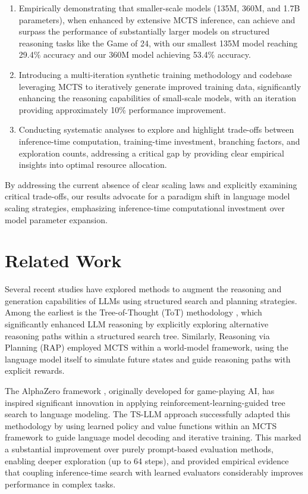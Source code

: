 \documentclass{article}
\begin{document}
\begin{enumerate}
\item Empirically demonstrating that smaller-scale models (135M, 360M, and 1.7B parameters), when enhanced by extensive MCTS inference, can achieve and surpass the performance of substantially larger models on structured reasoning tasks like the Game of 24, with our smallest 135M model reaching 29.4\% accuracy and our 360M model achieving 53.4\% accuracy.
\item Introducing a multi-iteration synthetic training methodology and codebase leveraging MCTS to iteratively generate improved training data, significantly enhancing the reasoning capabilities of small-scale models, with an iteration providing approximately 10\% performance improvement.
\item Conducting systematic analyses to explore and highlight trade-offs between inference-time computation, training-time investment, branching factors, and exploration counts, addressing a critical gap by providing clear empirical insights into optimal resource allocation.
\end{enumerate}

By addressing the current absence of clear scaling laws and explicitly examining critical trade-offs, our results advocate for a paradigm shift in language model scaling strategies, emphasizing inference-time computational investment over model parameter expansion.

\section{Related Work} Several recent studies have explored methods to augment the reasoning and generation capabilities of LLMs using structured search and planning strategies. Among the earliest is the Tree-of-Thought (ToT) methodology \cite{yao2023tree}, which significantly enhanced LLM reasoning by explicitly exploring alternative reasoning paths within a structured search tree. Similarly, Reasoning via Planning (RAP) \cite{hao2023reasoning} employed MCTS within a world-model framework, using the language model itself to simulate future states and guide reasoning paths with explicit rewards.

The AlphaZero framework \cite{silver2017mastering}, originally developed for game-playing AI, has inspired significant innovation in applying reinforcement-learning-guided tree search to language modeling. The TS-LLM approach \cite{feng2023alphazero} successfully adapted this methodology by using learned policy and value functions within an MCTS framework to guide language model decoding and iterative training. This marked a substantial improvement over purely prompt-based evaluation methods, enabling deeper exploration (up to 64 steps), and provided empirical evidence that coupling inference-time search with learned evaluators considerably improves performance in complex tasks.
\end{document}
